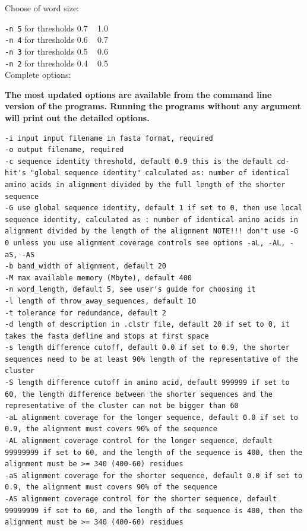 \documentclass[12pt,a4paper]{article}
\begin{document}
Choose of word size:

\texttt{-n 5} for thresholds 0.7 ~ 1.0\\
\texttt{-n 4} for thresholds 0.6 ~ 0.7\\
\texttt{-n 3} for thresholds 0.5 ~ 0.6\\
\texttt{-n 2} for thresholds 0.4 ~ 0.5\\

Complete options:

{\bf The most updated options are available from the command line version of the programs. Running the programs without any argument will print out the detailed options.}

\begin{lstlisting}
-i input input filename in fasta format, required
-o output filename, required
-c sequence identity threshold, default 0.9 this is the default cd-hit's "global sequence identity" calculated as: number of identical amino acids in alignment divided by the full length of the shorter sequence
-G use global sequence identity, default 1 if set to 0, then use local sequence identity, calculated as : number of identical amino acids in alignment divided by the length of the alignment NOTE!!! don't use -G 0 unless you use alignment coverage controls see options -aL, -AL, -aS, -AS
-b band_width of alignment, default 20
-M max available memory (Mbyte), default 400
-n word_length, default 5, see user's guide for choosing it
-l length of throw_away_sequences, default 10
-t tolerance for redundance, default 2
-d length of description in .clstr file, default 20 if set to 0, it takes the fasta defline and stops at first space
-s length difference cutoff, default 0.0 if set to 0.9, the shorter sequences need to be at least 90% length of the representative of the cluster
-S length difference cutoff in amino acid, default 999999 if set to 60, the length difference between the shorter sequences and the representative of the cluster can not be bigger than 60
-aL alignment coverage for the longer sequence, default 0.0 if set to 0.9, the alignment must covers 90% of the sequence
-AL alignment coverage control for the longer sequence, default 99999999 if set to 60, and the length of the sequence is 400, then the alignment must be >= 340 (400-60) residues
-aS alignment coverage for the shorter sequence, default 0.0 if set to 0.9, the alignment must covers 90% of the sequence
-AS alignment coverage control for the shorter sequence, default 99999999 if set to 60, and the length of the sequence is 400, then the alignment must be >= 340 (400-60) residues

\end{lstlisting}
\end{document}
